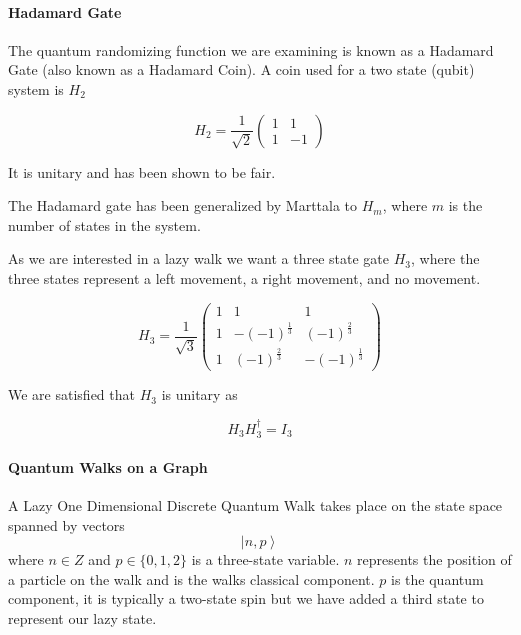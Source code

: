 \documentclass[a0,portrait]{a0poster}
\newcommand{\ket}[1]{\left| #1\right\rangle}
\begin{document}
\begin{center}
{\paragraph{Hadamard Gate}

The quantum randomizing function we are examining is known as a Hadamard Gate (also known as a Hadamard Coin). A coin used for a two state (qubit) system is $H_2$ 

\begin{equation}
H_2 = \dfrac{1}{\sqrt{2}} \begin{pmatrix}
  1 & 1 \\
  1 & -1 
\end{pmatrix}
\label{eq:1}
\end{equation}

It is unitary and has been shown\cite{Ke:2003} to be fair. 

The Hadamard gate has been generalized by Marttala\cite{Ma:2007} to $H_m$, where $m$ is the number of states in the system. 

As we are interested in a lazy walk we want a three state gate $H_3$, where the three states represent a left movement, a right movement, and no movement.

\begin{equation}
H_3 = \dfrac{1}{\sqrt{3}} \begin{pmatrix}
  1 & 1 & 1 \\
  1 & -(-1)^{\frac{1}{3}} & (-1)^{\frac{2}{3}} \\
  1 & (-1)^{\frac{2}{3}} & -(-1)^{\frac{1}{3}}
\end{pmatrix}
\label{eq:5}
\end{equation}

We are satisfied that $H_3$ is unitary as 

\begin{equation}
H_{3}H_{3}^{\dagger} = I_3
\label{eq:6}
\end{equation}

\paragraph{Quantum Walks on a Graph}

A Lazy One Dimensional Discrete Quantum Walk takes place on the state space spanned by vectors
\begin{equation}
\ket{n,p}
\label{eq:7}
\end{equation}
where $n\in Z$
and $p\in \{0,1,2\}$ is a three-state variable. $n$ represents the position of a particle on the walk and is the walks classical component. $p$ is the quantum component, it is typically a two-state spin but we have added a third state to represent our lazy state. 

}
\end{center}
\end{document}
